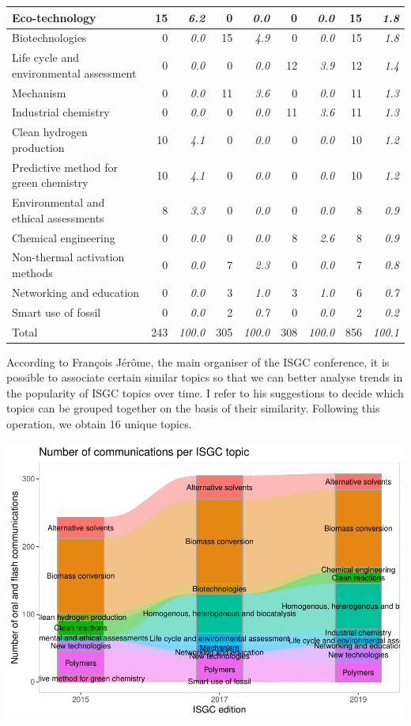 \documentclass[
]{article}
\begin{document}
\begin{table}
\begin{tabular}[t]{l|r|>{}r|r|>{}r|r|>{}r|r|>{}r}
\hline
Eco-technology & 15 & \em{6.2} & 0 & \em{0.0} & 0 & \em{0.0} & 15 & \em{1.8}\\
\hline
Biotechnologies & 0 & \em{0.0} & 15 & \em{4.9} & 0 & \em{0.0} & 15 & \em{1.8}\\
\hline
Life cycle and environmental assessment & 0 & \em{0.0} & 0 & \em{0.0} & 12 & \em{3.9} & 12 & \em{1.4}\\
\hline
Mechanism & 0 & \em{0.0} & 11 & \em{3.6} & 0 & \em{0.0} & 11 & \em{1.3}\\
\hline
Industrial chemistry & 0 & \em{0.0} & 0 & \em{0.0} & 11 & \em{3.6} & 11 & \em{1.3}\\
\hline
Clean hydrogen production & 10 & \em{4.1} & 0 & \em{0.0} & 0 & \em{0.0} & 10 & \em{1.2}\\
\hline
Predictive method for green chemistry & 10 & \em{4.1} & 0 & \em{0.0} & 0 & \em{0.0} & 10 & \em{1.2}\\
\hline
Environmental and ethical assessments & 8 & \em{3.3} & 0 & \em{0.0} & 0 & \em{0.0} & 8 & \em{0.9}\\
\hline
Chemical engineering & 0 & \em{0.0} & 0 & \em{0.0} & 8 & \em{2.6} & 8 & \em{0.9}\\
\hline
Non-thermal activation methods & 0 & \em{0.0} & 7 & \em{2.3} & 0 & \em{0.0} & 7 & \em{0.8}\\
\hline
Networking and education & 0 & \em{0.0} & 3 & \em{1.0} & 3 & \em{1.0} & 6 & \em{0.7}\\
\hline
Smart use of fossil & 0 & \em{0.0} & 2 & \em{0.7} & 0 & \em{0.0} & 2 & \em{0.2}\\
\hline
Total & 243 & \em{100.0} & 305 & \em{100.0} & 308 & \em{100.0} & 856 & \em{100.1}\\
\hline
\end{tabular}
\end{table}

According to François Jérôme, the main organiser of the ISGC conference,
it is possible to associate certain similar topics so that we can better
analyse trends in the popularity of ISGC topics over time. I refer to
his suggestions to decide which topics can be grouped together on the
basis of their similarity. Following this operation, we obtain 16 unique
topics.

\includegraphics{ISGC_files/figure-latex/unnamed-chunk-4-1.pdf}
\end{document}
